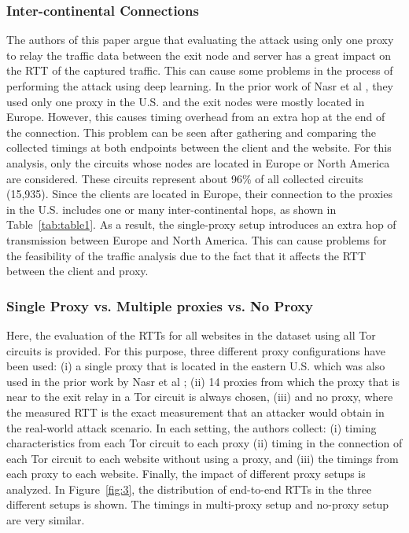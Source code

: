 \documentclass[sigconf]{acmart}
\begin{document}
\subsubsection{Inter-continental Connections}

The authors of this paper argue that evaluating the attack using only one proxy to relay the traffic data between the exit node and server has a great impact on the RTT of the captured traffic. This can cause some problems in the process of performing the attack using deep learning. In the prior work of Nasr et al \cite{nasr2018deepcorr}, they used only one proxy in the U.S. and the exit nodes were mostly located in Europe. However, this causes timing overhead from an extra hop at the end of the connection. This problem can be seen after gathering and comparing the collected timings at both endpoints between the client and the website. For this analysis, only the circuits whose nodes are located in Europe or North America are considered. These circuits represent about 96\% of all collected circuits (15,935). Since the clients are located in Europe, their connection to the proxies in the U.S. includes one or many inter-continental hops, as shown in Table~\ref{tab:table1}. As a result, the single-proxy setup introduces an extra hop of transmission between Europe and North America. This can cause problems for the feasibility of the traffic analysis due to the fact that it affects the RTT between the client and proxy.

\vspace{3mm}

\subsubsection{Single Proxy vs. Multiple proxies vs. No Proxy}
Here, the evaluation of the RTTs for all websites in the dataset using all Tor circuits is provided. For this purpose, three different proxy configurations have been used: (i) a single proxy that is located in the eastern U.S. which was also used in the prior work by Nasr et al \cite{nasr2018deepcorr}; (ii) 14 proxies from which the proxy that is near to the exit relay in a Tor circuit is always chosen, (iii) and no proxy, where the measured RTT is the exact measurement that an attacker would obtain in the real-world attack scenario. In each setting, the authors collect: (i) timing characteristics from each Tor circuit to each proxy (ii) timing in the connection of each Tor circuit to each website without using a proxy, and (iii) the timings from each proxy to each website. Finally, the impact of different proxy setups is analyzed.
In Figure~\ref{fig:3}, the distribution of end-to-end RTTs in the three different setups is shown. The timings in multi-proxy setup and no-proxy setup are very similar.
\end{document}
